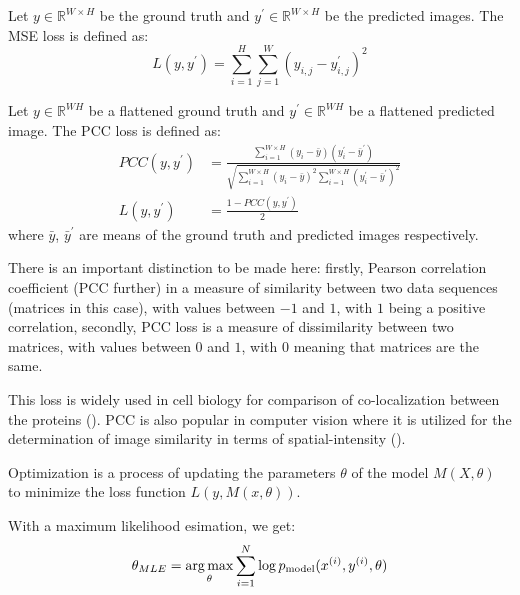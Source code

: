 \begin{definition}
	Let $y \in \mathbb{R}^{W \times H}$ be the ground truth and $y^\prime \in \mathbb{R}^{W \times H}$ be the predicted images. The MSE loss is defined as:
	\begin{equation}
		L(y, y^\prime) = \sum_{i=1}^{H} \sum_{j=1}^{W} (y_{i, j} - y_{i, j}^\prime)^2
	\end{equation}
\end{definition}

\begin{definition}
	\label{def:pcc-loss}
	Let $y \in \mathbb{R}^{WH}$ be a flattened ground truth and $y^\prime \in \mathbb{R}^{WH}$ be a flattened predicted image. The PCC loss is defined as:
	\begin{align}
		PCC(y, y^\prime) &= \frac{\sum\limits_{i=1}^{{W\times H}}{(y_i - \bar{y})(y_i^\prime - \bar{y}^\prime)}}{\sqrt{\sum\limits_{i=1}^{W\times H}{(y_i - \bar{y})^2\sum\limits_{i=1}^{W\times H}(y_i^\prime - \bar{y}^\prime)^2}}}  \\
		L(y, y^\prime) &= \frac{1 - PCC(y, y^\prime)}{2}
	\end{align}
	where $\bar{y}$, $\bar{y}^\prime$ are means of the ground truth and predicted images respectively.
	
	There is an important distinction to be made here: firstly, Pearson correlation coefficient (PCC further) in a measure of similarity between two data sequences (matrices in this case), with values between $-1$ and $1$, with $1$ being a positive correlation, secondly, PCC loss is a measure of dissimilarity between two matrices, with values between $0$ and $1$, with $0$ meaning that matrices are the same.

	This loss is widely used in cell biology for comparison of co-localization between the proteins (\cite{Lachance_2020}). PCC is also popular in computer vision where it is utilized for the determination of image similarity in terms of spatial-intensity (\cite{Lachance_2020}).
\end{definition}

\begin{definition}[Optimization]
	Optimization is a process of updating the parameters $\theta$ of the model $M(X, \theta)$ to minimize the loss function $L(y, M(x, \theta))$.
\end{definition}

With a maximum likelihood esimation, we get:
\begin{equation}
	\theta_{MLE} = \operatorname*{arg\,max}\limits_{\theta} \sum_{i=1}^{N} \log{p_{\text{model}}(x^{(i)}, y^{(i)}, \theta)}
\end{equation}

